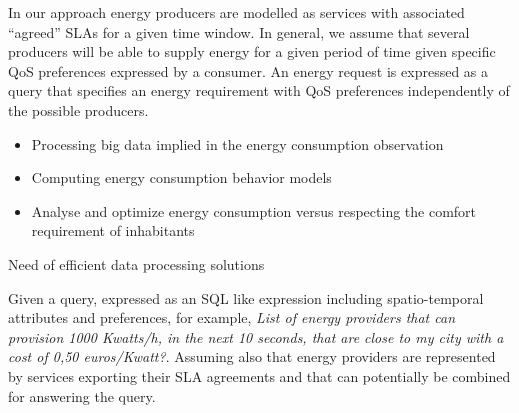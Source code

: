 In our approach energy producers are modelled as services with associated ``agreed'' SLAs for a given time window. 
In general, we assume that several producers will be able to supply energy for a given period of time given specific QoS preferences expressed by a consumer. 
An energy request is expressed as a query that specifies an energy requirement with QoS preferences independently of the possible producers. 

\begin{itemize}
\item Processing big data implied in the energy consumption observation 
\item Computing energy consumption behavior models
\item Analyse and optimize energy consumption versus respecting the comfort requirement of inhabitants
\end{itemize}

Need of efficient data processing solutions


 Given a query, expressed as an SQL like expression including spatio-temporal attributes and preferences, for example, {\em List of energy providers that can provision 1000 Kwatts/h, in the next 10 seconds, that are close to my city with a cost of 0,50 euros/Kwatt?}. Assuming also that energy providers are represented by services exporting their SLA agreements and that can potentially be combined for answering the query. 